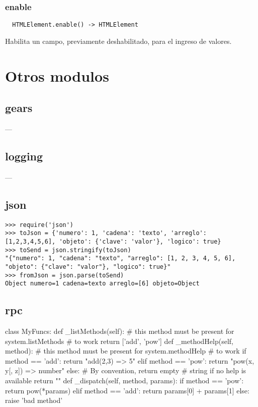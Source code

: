 \subsubsection*{enable}
\begin{verbatim}
  HTMLElement.enable() -> HTMLElement
\end{verbatim}
Habilita un campo, previamente deshabilitado, para el ingreso de valores.

\section{Otros modulos}
\subsection{gears}
---
\subsection{logging}
---
\subsection{json}
\begin{lstlisting}[style=consola]
>>> require('json')
>>> toJson = {'numero': 1, 'cadena': 'texto', 'arreglo': [1,2,3,4,5,6], 'objeto': {'clave': 'valor'}, 'logico': true}
>>> toSend = json.stringify(toJson)
"{"numero": 1, "cadena": "texto", "arreglo": [1, 2, 3, 4, 5, 6], "objeto": {"clave": "valor"}, "logico": true}"
>>> fromJson = json.parse(toSend)
Object numero=1 cadena=texto arreglo=[6] objeto=Object
\end{lstlisting}
\subsection{rpc}

class MyFuncs:
    def _listMethods(self):
        # this method must be present for system.listMethods
        # to work
        return ['add', 'pow']
    def _methodHelp(self, method):
        # this method must be present for system.methodHelp
        # to work
        if method == 'add':
            return "add(2,3) => 5"
        elif method == 'pow':
            return "pow(x, y[, z]) => number"
        else:
            # By convention, return empty
            # string if no help is available
            return ""
    def _dispatch(self, method, params):
        if method == 'pow':
            return pow(*params)
        elif method == 'add':
            return params[0] + params[1]
        else:
            raise 'bad method'
 
